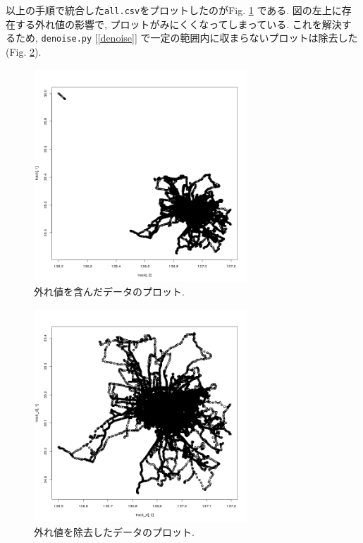 \documentclass[twocolumn, a4paper, 9pt]{jarticle}
\begin{document}
以上の手順で統合した\texttt{all.csv}をプロットしたのがFig. \ref{fig:raw} である. 図の左上に存在する外れ値の影響で, プロットがみにくくなってしまっている. これを解決するため, \texttt{denoise.py} [\ref{denoise}] で一定の範囲内に収まらないプロットは除去した (Fig. \ref{fig:denoise}). 

\begin{figure}[htbp]
  \begin{center}
    \includegraphics[clip,width=8cm]{images/allplot_raw.png}
    \caption{外れ値を含んだデータのプロット.}
    \label{fig:raw}
  \end{center}
\end{figure}

\begin{figure}[htbp]
  \begin{center}
    \includegraphics[clip,width=8cm]{images/allplot_denoise.png}
    \caption{外れ値を除去したデータのプロット.}
    \label{fig:denoise}
  \end{center}
\end{figure}
\end{document}
